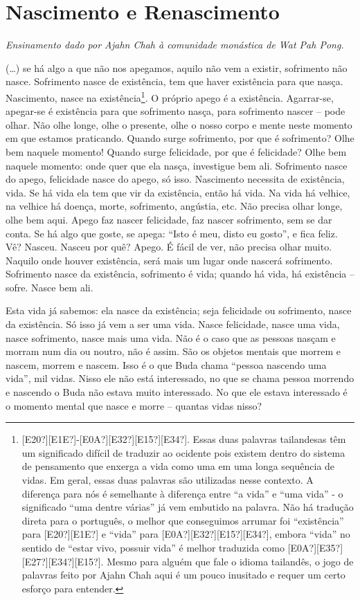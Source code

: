 
\chapter{Nascimento e Renascimento}

{\itshape
Ensinamento dado por Ajahn Chah à comunidade monástica de Wat Pah Pong.}

(…) se há algo a que não nos apegamos, aquilo não vem a existir,
sofrimento não nasce. Sofrimento nasce de existência, tem que haver
existência para que nasça. Nascimento, nasce na
existência\footnote{[E20?][E1E?]{}-[E0A?][E32?][E15?][E34?]. Essas duas
palavras tailandesas têm um significado difícil de traduzir ao ocidente
pois existem dentro do sistema de pensamento que enxerga a vida como
uma em uma longa sequência de vidas. Em geral, essas duas palavras são
utilizadas nesse contexto. A diferença para nós é semelhante à
diferença entre “a vida” e “uma vida” - o significado “uma dentre
várias” já vem embutido na palavra. Não há tradução direta para o
português, o melhor que conseguimos arrumar foi “existência” para
[E20?][E1E?] e “vida” para [E0A?][E32?][E15?][E34?], embora “vida” no
sentido de “estar vivo, possuir vida” é melhor traduzida como
[E0A?][E35?][E27?][E34?][E15?]. Mesmo para alguém que fale o idioma
tailandês, o jogo de palavras feito por Ajahn Chah aqui é um pouco
inusitado e requer um certo esforço para entender.}. O próprio apego é
a existência. Agarrar-se, apegar-se é existência para que sofrimento
nasça, para sofrimento nascer – pode olhar. Não olhe longe, olhe o
presente, olhe o nosso corpo e mente neste momento em que estamos
praticando. Quando surge sofrimento, por que é sofrimento? Olhe bem
naquele momento! Quando surge felicidade, por que é felicidade? Olhe
bem naquele momento: onde quer que ela nasça, investigue bem ali.
Sofrimento nasce do apego, felicidade nasce do apego, só isso.
Nascimento necessita de existência, vida. Se há vida ela tem que vir da
existência, então há vida. Na vida há velhice, na velhice há doença,
morte, sofrimento, angústia, etc. Não precisa olhar longe, olhe bem
aqui. Apego faz nascer felicidade, faz nascer sofrimento, sem se dar
conta. Se há algo que goste, se apega: “Isto é meu, disto eu gosto”, e
fica feliz. Vê? Nasceu. Nasceu por quê? Apego. É fácil de ver, não
precisa olhar muito. Naquilo onde houver existência, será mais um lugar
onde nascerá sofrimento. Sofrimento nasce da existência, sofrimento é
vida; quando há vida, há existência – sofre. Nasce bem ali. 

Esta vida já sabemos: ela nasce da existência; seja felicidade ou
sofrimento, nasce da existência. Só isso já vem a ser uma vida. Nasce
felicidade, nasce uma vida, nasce sofrimento, nasce mais uma vida. Não
é o caso que as pessoas nasçam e morram num dia ou noutro, não é assim.
São os objetos mentais que morrem e nascem, morrem e nascem. Isso é o
que Buda chama “pessoa nascendo uma vida”, mil vidas. Nisso ele não
está interessado, no que se chama pessoa morrendo e nascendo o Buda não
estava muito interessado. No que ele estava interessado é o momento
mental que nasce e morre – quantas vidas nisso? 

